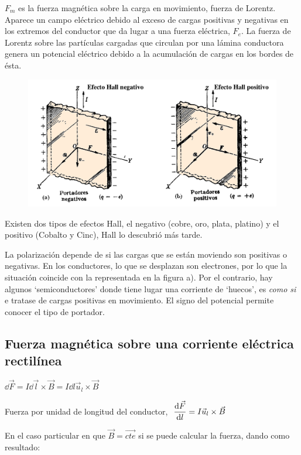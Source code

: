 $F_m$ es la fuerza magnética sobre la carga en movimiento, fuerza de Lorentz.  Aparece un campo eléctrico debido al exceso de cargas positivas y negativas en los extremos del conductor que da lugar a una fuerza eléctrica, $F_e$. La fuerza de Lorentz sobre las partículas cargadas que circulan por una lámina conductora genera un potencial eléctrico debido a la acumulación de cargas en los bordes de ésta.

\begin{figure}[H]
	\centering
	\includegraphics[width=1.1\textwidth]{imagenes/imagenes26/T26IM12.png}
	\end{figure}

Existen dos tipos de efectos Hall, el negativo (cobre, oro, plata, platino) y el positivo (Cobalto y Cinc), Hall lo descubrió más tarde.

La polarización depende de si las cargas que se están moviendo son positivas o negativas. En los conductores, lo que se desplazan son electrones, por lo que la situación coincide con la representada en la figura a). Por el contrario, hay algunos `semiconductores' donde tiene lugar una corriente de `huecos', es \emph{como si} e tratase de cargas positivas en movimiento. El signo del potencial permite conocer el tipo de portador.

\subsection{Fuerza magnética sobre una corriente eléctrica rectilínea}

$\dd \vec F  = I\dd \vec  l \times \vec B=I\dd l \vec u_l \times \vec B$

Fuerza por unidad de longitud del conductor, $\ \displaystyle \dv{\vec F}{l} = I\vec u_l \times \vec B$

En el caso particular en que $\vec B=\overrightarrow{cte}$ si se puede calcular la fuerza, dando como resultado:

